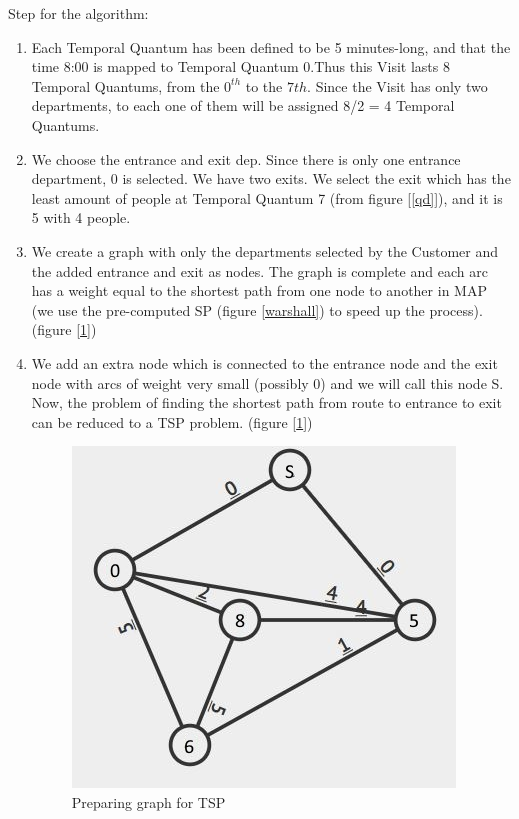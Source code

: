 \documentclass[a4paper, 12pt, oneside, table]{article}
\begin{document}
Step for the algorithm:
\begin{enumerate}
    \item Each Temporal Quantum has been defined to be 5 minutes-long, and that the time 8:00 is mapped to Temporal Quantum 0.Thus this Visit lasts 8 Temporal Quantums, from the $0^{th}$ to the $7th$. Since the Visit has only two departments, to each one of them will be assigned 8/2 = 4 Temporal Quantums.
    \item We choose the entrance and exit dep. Since there is only one entrance department, 0 is selected. We have two exits. We select the exit which has the least amount of people at Temporal Quantum 7 (from figure [\ref{qd}]), and it is 5 with 4 people.
    \item We create a graph with only the departments selected by the Customer and the added entrance and exit as nodes. The graph is complete and each arc has a weight equal to the shortest path from one node to another in MAP (we use the pre-computed SP (figure \ref{warshall}) to speed up the process). (figure [\ref{graphForTSP}])
    \item We add an extra node which is connected to the entrance node and the exit node with arcs of weight very small (possibly 0) and we will call this node S. Now, the problem of finding the shortest path from route to entrance to exit can be reduced to a TSP problem. (figure [\ref{graphForTSP}])
    \begin{figure}[H]
    \centering
        \centering
        \includegraphics[height=0.4\textheight, scale=0.2, keepaspectratio]{img/alg_map_man/graph_for_tsp2.JPG}
        \caption{Preparing graph for TSP}
        \label{graphForTSP}
    \end{figure}

\end{enumerate}
\end{document}
